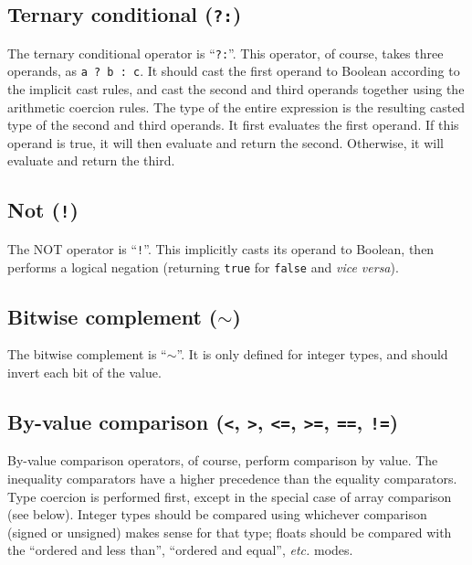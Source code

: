 \documentclass{article}
\begin{document}
\subsection{Ternary conditional (\texttt{?:})}
\label{sub:operators:ternary}
The ternary conditional operator is ``\texttt{?:}''. This operator, of course,
takes three operands, as \texttt{a~?~b~:~c}. It should cast the first operand
to Boolean according to the implicit cast rules, and cast the second and third
operands together using the arithmetic coercion rules. The type of the entire
expression is the resulting casted type of the second and third operands.
It first evaluates the first operand. If this operand is true, it will
then evaluate and return the second. Otherwise, it will evaluate and return the
third.

\subsection{Not (\texttt{!})}
\label{sub:operators:not}
The NOT operator is ``\texttt{!}''. This implicitly casts its operand to
Boolean, then performs a logical negation (returning \texttt{true} for
\texttt{false} and {\it vice versa}).

\subsection{Bitwise complement (\texttt{$\sim$})}
\label{sub:operators:complement}
The bitwise complement is ``\texttt{$\sim$}''. It is only defined for integer
types,
and should invert each bit of the value.

\subsection{By-value comparison (\texttt{<}, \texttt{>}, \texttt{<=},
  \texttt{>=}, \texttt{==}, \texttt{!=})}
\label{sub:operators:valcomp}
By-value comparison operators, of course, perform comparison by value. The
inequality comparators have a higher precedence than the equality
comparators. Type coercion is performed first, except in the special case of
array comparison (see below). Integer types should be compared using whichever
comparison (signed or unsigned) makes sense for that type; floats should be
compared with the ``ordered and less than'', ``ordered and equal'',
{\it etc.} modes.
\end{document}
